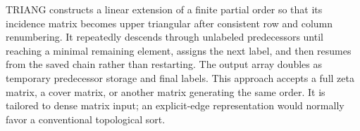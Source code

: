 \documentclass[10pt,letterpaper]{article}
\begin{document}
\begin{tcolorbox}[colback=Ink!4,colframe=Ink,title=Cornell summary]
TRIANG constructs a linear extension of a finite partial order so that its incidence matrix becomes upper triangular after consistent row and column renumbering. It repeatedly descends through unlabeled predecessors until reaching a minimal remaining element, assigns the next label, and then resumes from the saved chain rather than restarting. The output array doubles as temporary predecessor storage and final labels. This approach accepts a full zeta matrix, a cover matrix, or another matrix generating the same order. It is tailored to dense matrix input; an explicit-edge representation would normally favor a conventional topological sort.
\end{tcolorbox}
\end{document}
